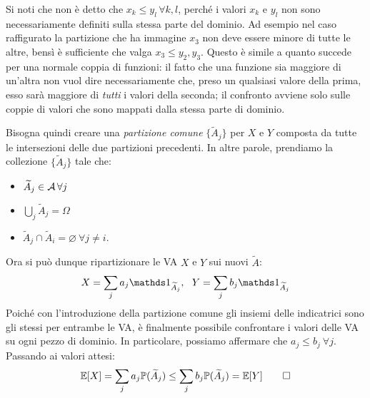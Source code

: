 \begin{dimo}
\begin{enumerate}
      Si noti che non è detto che $x_k \leq y_l \, \forall k,l$, perché i valori $x_k$ e $y_l$ non sono necessariamente definiti sulla stessa parte del dominio.
      Ad esempio nel caso raffigurato la partizione che ha immagine $x_3$ non deve essere minore di tutte le altre, bensì è sufficiente che valga $x_3 \leq y_2, y_3$.
      Questo è simile a quanto succede per una normale coppia di funzioni: il fatto che una funzione sia maggiore di un'altra non vuol dire necessariamente che, preso un qualsiasi valore della prima, esso sarà maggiore di \emph{tutti} i valori della seconda;
      il confronto avviene solo sulle coppie di valori che sono mappati dalla stessa parte di dominio.
      \begin{figure}[H]
        \centering
        \def\drect {(-1.5, -1.5) rectangle (2.5, 1.5)}
        \label{Partizioni_XY_irr}
      \end{figure}
      Bisogna quindi creare una \emph{partizione comune} $\{\widetilde A_j\}$ per $X$ e $Y$ composta da tutte le intersezioni delle due partizioni precedenti.
      In altre parole, prendiamo la collezione $\{\widetilde A_j\}$ tale che:
      \begin{itemize}
      	\item $\widetilde A_j \in \mathcal A \, \forall j$
      	\item $\bigcup_j \widetilde A_j = \Omega$
      	\item $\widetilde A_j \cap \widetilde A_i = \varnothing \ \forall j \neq i$.
      \end{itemize}
      Ora si può dunque ripartizionare le VA $X$ e $Y$ sui nuovi $\widetilde A$:
      $$X = \sum\limits_{j} a_j \Ind_{\widetilde A_j}, \ \ Y = \sum\limits_j b_j \Ind_{\widetilde A_j}$$
      Poiché con l'introduzione della partizione comune gli insiemi delle indicatrici sono gli stessi per entrambe le VA, è finalmente possibile confrontare i valori delle VA su ogni pezzo di dominio.
      In particolare, possiamo affermare che $a_j \leq b_j \ \forall j$.
      Passando ai valori attesi:
      $$\mathbb E[X] = \sum\limits_j a_j \mathbb P(\widetilde A_j) \leq \sum\limits_{j} b_j \mathbb P(\widetilde A_j) = \mathbb E[Y] \qedhere$$
	\end{enumerate}
\end{dimo}

